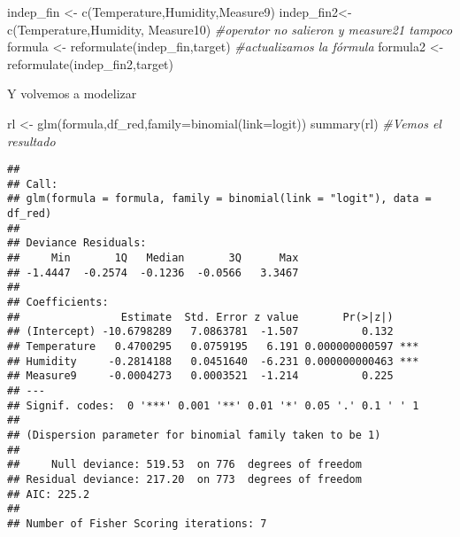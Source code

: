 \documentclass[
]{article}
\newenvironment{Shaded}{\begin{snugshade}}{\end{snugshade}}
\newcommand{\AttributeTok}[1]{\textcolor[rgb]{0.77,0.63,0.00}{#1}}
\newcommand{\CommentTok}[1]{\textcolor[rgb]{0.56,0.35,0.01}{\textit{#1}}}
\newcommand{\FunctionTok}[1]{\textcolor[rgb]{0.00,0.00,0.00}{#1}}
\newcommand{\NormalTok}[1]{#1}
\newcommand{\OtherTok}[1]{\textcolor[rgb]{0.56,0.35,0.01}{#1}}
\newcommand{\StringTok}[1]{\textcolor[rgb]{0.31,0.60,0.02}{#1}}
\begin{document}
\begin{Shaded}
\begin{Highlighting}[]
\NormalTok{indep\_fin }\OtherTok{\textless{}{-}} \FunctionTok{c}\NormalTok{(}\StringTok{\textquotesingle{}Temperature\textquotesingle{}}\NormalTok{,}\StringTok{\textquotesingle{}Humidity\textquotesingle{}}\NormalTok{,}\StringTok{\textquotesingle{}Measure9\textquotesingle{}}\NormalTok{)}
\NormalTok{indep\_fin2}\OtherTok{\textless{}{-}}\FunctionTok{c}\NormalTok{(}\StringTok{\textquotesingle{}Temperature\textquotesingle{}}\NormalTok{,}\StringTok{\textquotesingle{}Humidity\textquotesingle{}}\NormalTok{,}
              \StringTok{\textquotesingle{}Measure10\textquotesingle{}}\NormalTok{) }\CommentTok{\#operator no salieron y measure21 tampoco}
\NormalTok{formula }\OtherTok{\textless{}{-}} \FunctionTok{reformulate}\NormalTok{(indep\_fin,target) }\CommentTok{\#actualizamos la fórmula}
\NormalTok{formula2 }\OtherTok{\textless{}{-}} \FunctionTok{reformulate}\NormalTok{(indep\_fin2,target)}
\end{Highlighting}
\end{Shaded}

Y volvemos a modelizar

\begin{Shaded}
\begin{Highlighting}[]
\NormalTok{rl }\OtherTok{\textless{}{-}} \FunctionTok{glm}\NormalTok{(formula,df\_red,}\AttributeTok{family=}\FunctionTok{binomial}\NormalTok{(}\AttributeTok{link=}\StringTok{\textquotesingle{}logit\textquotesingle{}}\NormalTok{))}
\FunctionTok{summary}\NormalTok{(rl) }\CommentTok{\#Vemos el resultado}
\end{Highlighting}
\end{Shaded}

\begin{verbatim}
## 
## Call:
## glm(formula = formula, family = binomial(link = "logit"), data = df_red)
## 
## Deviance Residuals: 
##     Min       1Q   Median       3Q      Max  
## -1.4447  -0.2574  -0.1236  -0.0566   3.3467  
## 
## Coefficients:
##                Estimate  Std. Error z value       Pr(>|z|)    
## (Intercept) -10.6798289   7.0863781  -1.507          0.132    
## Temperature   0.4700295   0.0759195   6.191 0.000000000597 ***
## Humidity     -0.2814188   0.0451640  -6.231 0.000000000463 ***
## Measure9     -0.0004273   0.0003521  -1.214          0.225    
## ---
## Signif. codes:  0 '***' 0.001 '**' 0.01 '*' 0.05 '.' 0.1 ' ' 1
## 
## (Dispersion parameter for binomial family taken to be 1)
## 
##     Null deviance: 519.53  on 776  degrees of freedom
## Residual deviance: 217.20  on 773  degrees of freedom
## AIC: 225.2
## 
## Number of Fisher Scoring iterations: 7
\end{verbatim}
\end{document}
